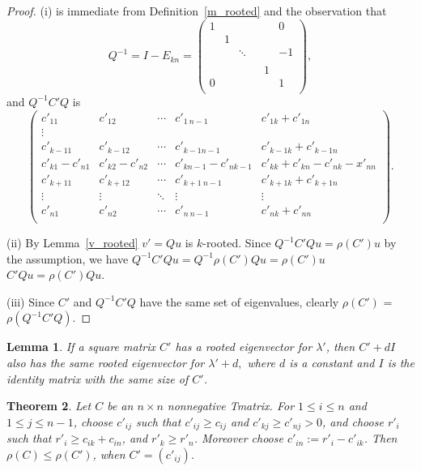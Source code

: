 \documentclass[12pt]{report}
\theoremstyle{plain}
\newtheorem{thm}{Theorem}[chapter]
\newtheorem{lem}[thm]{Lemma}
\theoremstyle{definition}
\begin{document}
\begin{proof}
(i) is immediate from Definition~\ref{m_rooted} and the observation that
$$Q^{-1}=I-E_{kn}=\begin{pmatrix}
1 &  & & &  & 0 \\
 & 1 &  &      &  &  \\
 &  & \ddots & &  & -1 \\
 &  &        & &  &  \\
  &  & & & 1 &  \\
0 &  & & &  & 1 \\
\end{pmatrix},$$
and $Q^{-1}C'Q$ is
$$\begin{pmatrix}
c'_{11}     & c'_{12} & \cdots     & c'_{1\ n-1} & c'_{1k}+c'_{1n} \\
\vdots \\
c'_{k-11}     & c'_{k-1 2}           & \cdots     & c'_{k-1 n-1} & c'_{k-1k}+c'_{k-1n} \\
c'_{k1}-c'_{n1} & c'_{k2}-c'_{n2} &\cdots      &c'_{kn-1}-c'_{nk-1}& c'_{kk}+c'_{kn}-c'_{nk}-x'_{nn}\\
c'_{k+11}     & c'_{k+12}           & \cdots     & c'_{k+1\ n-1} & c'_{k+1k}+c'_{k+1n} \\
\vdots              & \vdots & \ddots              & \vdots & \vdots \\
c'_{n1}             & c'_{n2} & \cdots             & c'_{n\ n-1} & c'_{nk}+c'_{nn} \\
\end{pmatrix}.
$$



(ii)
By Lemma~\ref{v_rooted} $v'=Qu$ is $k$-rooted.
Since $Q^{-1}C'Qu=\rho(C')u$ by the assumption, we have
$Q^{-1} C' Q u  = Q^{-1} \rho(C') Qu  =\rho(C')u$  \\
$C'Qu=\rho(C')Qu$.



(iii)
Since $C'$ and $Q^{-1}C'Q$ have the same set of eigenvalues, clearly $\rho(C')$ = $\rho(Q^{-1}C'Q)$.

\end{proof}


\begin{lem}\label{l_diag}
If a square matrix $C'$ has a rooted eigenvector for $\lambda'$, then $C'+dI$ also has
the same rooted eigenvector for $\lambda'+d,$ where $d$ is a constant and $I$ is the identity matrix with the same size of $C'$.
\end{lem}

\begin{thm}
Let $C$ be an $n\times n$ nonnegative Tmatrix. For $1\leq i \leq n$ and $1\leq j\leq n-1$, choose $c'_{ij}$
such that $c'_{ij}\geq c_{ij}$ and $c'_{kj}\geq c'_{nj}>0$, and choose $r'_i$ such that $r'_i\geq c_{ik}+c_{in}$, and
$r'_k \geq r'_n$. Moreover choose $c'_{in}:=r'_i-c'_{ik}$. Then $\rho(C)\leq \rho(C')$, when $C'=(c'_{ij})$.
\end{thm}
\end{document}
